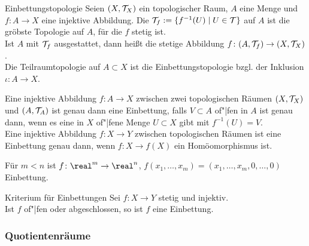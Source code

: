 \linie

\begin{Def}{Einbettungstopologie}
    Seien $(X, \mathcal{T}_X)$ ein topologischer Raum, $A$ eine Menge und \\
    $f\colon A \rightarrow X$ eine injektive Abbildung.
    Die  $\mathcal{T}_f := \{f^{-1}(U) \;|\; U \in \mathcal{T}\}$
    auf $A$ ist die gröbste Topologie auf $A$, für die $f$ stetig ist. \\
    Ist $A$ mit $\mathcal{T}_f$ ausgestattet, dann heißt die stetige Abbildung
    $f\colon (A, \mathcal{T}_f) \rightarrow (X, \mathcal{T}_X)$ . \\
    Die Teilraumtopologie auf $A \subset X$ ist die Einbettungstopologie
    bzgl. der Inklusion $\iota\colon A \rightarrow X$.
\end{Def}

\begin{Bem}
    Eine injektive Abbildung $f\colon A \rightarrow X$ zwischen zwei
    topologischen Räumen $(X, \mathcal{T}_X)$ und $(A, \mathcal{T}_A)$
    ist genau dann eine Einbettung, falls
    $V \subset A$ of"|fen in $A$ ist genau dann, wenn es eine in $X$ of"|fene
    Menge $U \subset X$ gibt mit $f^{-1}(U) = V$. \\
    Eine injektive Abbildung $f\colon X \rightarrow Y$ zwischen topologischen
    Räumen ist eine Einbettung genau dann, wenn
    $f\colon X \rightarrow f(X)$ ein Homöomorphismus ist.
\end{Bem}

\begin{Bsp}
    Für $m < n$ ist $f\colon \real^m \rightarrow \real^n$,
    $f(x_1, \dotsc, x_m) = (x_1, \dotsc, x_m, 0, \dotsc, 0)$
    Einbettung.
\end{Bsp}

\begin{Satz}{Kriterium für Einbettungen}
    Sei $f\colon X \rightarrow Y$ stetig und injektiv. \\
    Ist $f$ of"|fen oder abgeschlossen, so ist $f$ eine Einbettung.
\end{Satz}

\pagebreak

\subsubsection{%
    Quotientenräume%
}

